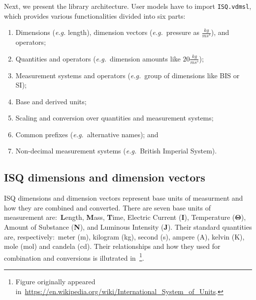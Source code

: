 \documentclass[runningheads,a4paper]{llncs}
\begin{document}
Next, we present the library architecture. User models have to import \texttt{ISQ.vdmsl}, which provides various functionalities divided into six parts: 
%
\begin{enumerate}
    \item Dimensions (\textit{e.g.} length), dimension vectors (\textit{e.g.}~pressure as \(\frac{kg}{ms^s}\)), and operators;
    \item Quantities and operators (\textit{e.g.}~dimension amounts like \(20\frac{kg}{ms^s}\));
    \item Measurement systems and operators (\textit{e.g.}~group of dimensions like BIS or SI); 
    \item Base and derived units;
    \item Scaling and conversion over quantities and measurement systems;
    \item Common prefixes (\textit{e.g.}~alternative names); and 
    \item Non-decimal measurement systems (\textit{e.g.}~British Imperial System). 
\end{enumerate} 

 
\subsection*{ISQ dimensions and dimension vectors}

ISQ dimensions and dimension vectors represent base units of measurment and how they are combined and converted. There are seven base units of measurement are:~\textbf{L}ength, \textbf{M}ass, \textbf{T}ime, Electric Current (\textbf{I}), Temperature (\(\mathbf{\Theta}\)), Amount of Substance (\textbf{N}), and Luminous Intensity (\textbf{J}). Their standard quantities are, respectively:~meter (m), kilogram (kg), second (s), ampere (A), kelvin (K), mole (mol) and candela (cd). Their relationships and how they used for combination and conversions is illutrated in~\footnote{Figure originally appeared in~\url{https://en.wikipedia.org/wiki/International_System_of_Units}.}.  
\end{document}
